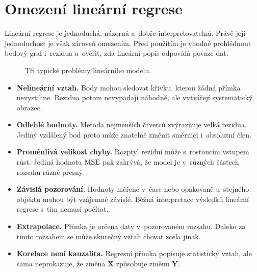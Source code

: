\section{Omezení lineární regrese}\label{sec:ai-omezeni-regrese}

Lineární regrese je jednoduchá, názorná a~dobře interpretovatelná. Právě její jednoduchost je však zároveň omezením. Před použitím je vhodné prohlédnout bodový graf i~rezidua a~ověřit, zda lineární popis odpovídá povaze dat.

\begin{figure}[ht]
    \centering
    
    \caption{Tři typické problémy lineárního modelu.}
    \label{fig:ai-regrese-omezeni}
\end{figure}

\begin{itemize}
    \item \textbf{Nelineární vztah.} Body mohou sledovat křivku, kterou žádná přímka nevystihne. Rezidua potom nevypadají náhodně, ale vytvářejí systematický obrazec.
    \item \textbf{Odlehlé hodnoty.} Metoda nejmenších čtverců zvýrazňuje velká rezidua. Jediný vzdálený bod proto může znatelně změnit směrnici i~absolutní člen.
    \item \textbf{Proměnlivá velikost chyby.} Rozptyl reziduí může s~rostoucím vstupem růst. Jediná hodnota \(\operatorname{MSE}\) pak zakrývá, že model je v~různých částech rozsahu různě přesný.
    \item \textbf{Závislá pozorování.} Hodnoty měřené v~čase nebo opakovaně u~stejného objektu mohou být vzájemně závislé. Běžná interpretace výsledků lineární regrese s~tím nemusí počítat.
    \item \textbf{Extrapolace.} Přímka je určena daty v~pozorovaném rozsahu. Daleko za tímto rozsahem se může skutečný vztah chovat zcela jinak.
    \item \textbf{Korelace není kauzalita.} Regresní přímka popisuje statistický vztah, ale sama neprokazuje, že změna \(\mathbf{X}\) způsobuje změnu \(\mathbf{Y}\).
\end{itemize}

